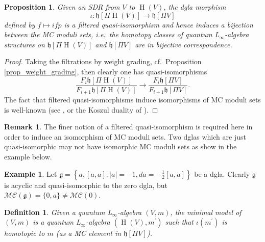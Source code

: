 \documentclass[]{amsart}
\newtheorem{proposition}[theorem]{Proposition}
\newtheorem{definition}[theorem]{Definition}
\theoremstyle{definition}
\newtheorem{example}[theorem]{Example}
\newtheorem{remark}[theorem]{Remark}
\newcommand{\Linf}{L$_\infty$}
\newcommand{\homology}{\operatorname{H}}
\begin{document}
\begin{proposition}\label{prop_filtered_quasi_iso}
Given an SDR from $V$ to $\homology (V)$, the dgla morphism 
\[
\iota\colon \mathfrak{h}[\Pi\homology (V)]\to\mathfrak{h}[\Pi V]
\]
defined by $f\mapsto i f p$ is a filtered quasi-isomorphism and hence induces a bijection between the MC moduli sets, i.e.~the homotopy classes of quantum \Linf-algebra structures on $\mathfrak{h}[\Pi\homology (V)]$ and $\mathfrak{h}[\Pi V]$ are in bijective correspondence.
\end{proposition}
\begin{proof}
Taking the filtrations by weight grading, cf.~Proposition \ref{prop_weight_grading}, then clearly one has quasi-isomorphisms
\[
\frac{F_i\mathfrak{h}[\Pi \homology (V)]}{F_{i+1}\mathfrak{h}[\Pi \homology (V)]}\to\frac{F_i \mathfrak{h}[\Pi V]}{F_{i+1}\mathfrak{h}[\Pi V]}.
\]
The fact that filtered quasi-isomorphisms induce isomorphisms of MC moduli sets is well-known (see \cite{braun,getzler}, or the Koszul duality of \cite{laz_markl,maunder_unbased_rat_homo}).
\end{proof}

\begin{remark}
The finer notion of a filtered quasi-isomorphism is required here in order to induce an isomorphism of MC moduli sets. Two dglas which are just quasi-isomorphic may not have isomorphic MC moduli sets as show in the example below.
\end{remark}

\begin{example}
Let $\mathfrak{g}= \left\lbrace a,[a,a]:|a|=-1, da=-\frac{1}{2}[a,a]\right\rbrace$ be a dgla. Clearly $\mathfrak{g}$ is acyclic and quasi-isomorphic to the zero dgla, but $\mathcal{MC}(\mathfrak{g})=\lbrace 0,a\rbrace\neq\mathcal{MC}(0)$.
\end{example}

\begin{definition}\label{def_minimal}
Given a quantum \Linf-algebra $(V,m)$, the minimal model of $(V,m)$ is a quantum \Linf-algebra $(\homology(V),m^\prime)$ such that $\iota(m^\prime)$ is homotopic to $m$ (as a MC element in $\mathfrak{h}[\Pi V]$).
\end{definition}
\end{document}
